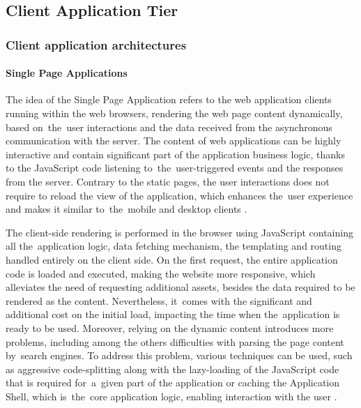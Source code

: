 \subsection{Client Application Tier} \label{chapter:client-application-tier}

\subsubsection{Client application architectures}

\paragraph{Single Page Applications} \label{chapter:client-application-tier-single-page-app}

The idea of the Single Page Application \cite{SPA} refers to the web application clients running within the web browsers, rendering the web page content dynamically, based on~the~user interactions and the data received from the asynchronous communication with the server. The content of web applications can be highly interactive and contain significant part of the application business logic, thanks to the JavaScript code listening to~the~user-triggered events and the responses from the server.
Contrary to the static pages, the user interactions does not require to reload the view of the application, which enhances the~user experience and makes it similar to~the~mobile and desktop clients \cite{PerspectivesOnArchitectureEvolution}.

The client-side rendering is performed in the browser using JavaScript containing all the~application logic, data fetching mechanism, the templating and routing handled entirely on the client side. On the first request, the entire application code is loaded and executed, making the website more responsive, which alleviates the need of requesting additional assets, besides the data required to be rendered as the content. Nevertheless, it~comes with the significant and additional cost on the initial load, impacting the time when the~application is ready to be used. Moreover, relying on the dynamic content introduces more problems, including among the others difficulties with parsing the page content by~search engines. To address this problem, various techniques can be used, such as aggressive code-splitting along with the lazy-loading of the JavaScript code that is required for~a~given part of the application or caching the Application Shell, which is~the~core application logic, enabling interaction with the user \cite{GoogleRenderingOnTheWeb}.


